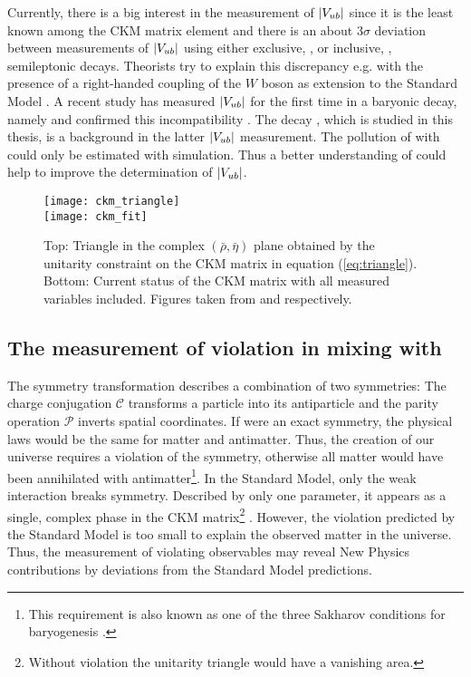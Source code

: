 Currently, there is a big interest in the measurement of $|{V_{{u}{b}}}|$ since it is the least known among the CKM matrix element and there is an about $3\sigma$ deviation between measurements of $|{V_{{u}{b}}}|$ using either exclusive, \decay{\B}{\pi\ell\neul}, or inclusive, , semileptonic decays.
Theorists try to explain this discrepancy e.g. with the presence of a right-handed coupling of the $W$ boson as extension to the Standard Model \cite{Vub_RightHanded}.
A recent \lhcb study has measured $|{V_{{u}{b}}}|$ for the first time in a baryonic decay, namely \decay{\Lb}{\proton\mun\neumb} and confirmed this incompatibility \cite{SL_Vub}.
The decay \LbToDpmunuX, which is studied in this thesis, is a background in the latter $|{V_{{u}{b}}}|$ measurement.
The pollution of \decay{\Lb}{\proton\mun\neumb} with \LbToDpmunuX could only be estimated with simulation.
Thus a better understanding of \LbToDpmunuX could help to improve the determination of $|{V_{{u}{b}}}|$.
\begin{figure}[tb]
    \centering
	\texttt{[image: ckm\_triangle]} \\	
	\texttt{[image: ckm\_fit]}	
	\caption{Top: Triangle in the complex $(\bar{\rho}, \bar{\eta})$ plane obtained by the unitarity constraint on the CKM matrix in equation (\ref{eq:triangle}). Bottom: Current status of the CKM matrix with all measured variables included. Figures taken from \cite{PDG} and \cite{CKM_fitter}
    respectively.}
	\label{fig:CKM_triangle}
\end{figure}

\subsection{The measurement of \CP violation in mixing with \asld}
The symmetry transformation \CP describes a combination of two symmetries:
The charge conjugation $\mathcal{C}$ transforms a particle into its antiparticle and the parity operation $\mathcal{P}$ inverts spatial coordinates.
If \CP were an exact symmetry, the physical laws would be the same for matter and antimatter.
Thus, the creation of our universe requires a violation of the \CP symmetry, otherwise all matter would have been annihilated with antimatter\footnote{This requirement is also known as one of the three Sakharov conditions for baryogenesis \cite{Sakharov}.}.
In the Standard Model, only the weak interaction breaks \CP symmetry.
Described by only one parameter, it appears as a single, complex phase in the CKM matrix\footnote{Without \CP violation the unitarity triangle would have a vanishing area.} \cite{Kobayashi_CKM}.
However, the \CP violation predicted by the Standard Model is too small to explain the observed matter in the universe.
Thus, the measurement of \CP violating observables may reveal New Physics contributions by deviations from the Standard Model predictions.

